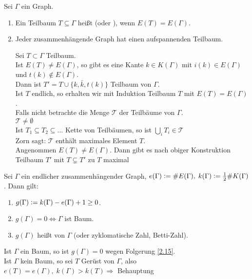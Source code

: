 \documentclass[a4paper, 10pt]{report}
\begin{document}
\begin{DefBem}
Sei $\Gamma$ ein Graph.
\begin{enumerate}
  \item Ein Teilbaum $T \subseteq \Gamma$ heißt
   (oder ),
  wenn $E(T)=E(\Gamma)$.
  \item Jeder zusammenhängende Graph hat einen aufspannenden Teilbaum.
  \begin{Bew}
  Sei $T \subset \Gamma$ Teilbaum.\\
  Ist $E(T) \not= E(\Gamma)$, so gibt es eine Kante $k \in K(\Gamma)$ mit $i(k)
  \in E(\Gamma)$ und $t(k) \not\in E(\Gamma)$.\\
  Dann ist $T' = T \cup \{k, \bar{k}, t(k)\}$ Teilbaum von $\Gamma$.\\
  Ist $T$ endlich, so erhalten wir mit Induktion Teilbaum $T$ mit $E(T) =
  E(\Gamma)$.\\
  Falls nicht betrachte die Menge $\mathcal{T}$ der Teilbäume von $\Gamma$.\\
  $\mathcal{T} \not= \emptyset$ \chk\\ 
  Ist $T_1 \subseteq T_2 \subseteq \ldots$ Kette von Teilbäumen, so ist
  $\bigcup_i T_i \in \mathcal{T}$ \chk\\
  Zorn sagt: $\mathcal{T}$ enthält maximales Element $T$.\\
  Angenommen $E(T) \not= E(\Gamma)$. Dann gibt es nach obiger Konstruktion
  Teilbaum $T'$ mit $T \subsetneq T'$ \WSpr zu $T$ maximal
  \end{Bew}
\end{enumerate}
\end{DefBem}


\begin{BemDef}
\label{2.7}
Sei $\Gamma$ ein endlicher zusammenhängender Graph, $e(\Gamma) \mathrel{\mathop:}=
\#E(\Gamma), \; k(\Gamma) \mathrel{\mathop:}= \frac{1}{2}\#K(\Gamma)$.
Dann gilt:
\begin{enumerate}
  \item $g(\Gamma) \mathrel{\mathop:}= k(\Gamma) - e(\Gamma) + 1 \ge 0$.
  \item \label{2.7b}
  $g(\Gamma) = 0 \Leftrightarrow \Gamma$ ist Baum.
  \item $g(\Gamma)$ heißt  von $\Gamma$ (oder
  zyklomatische Zahl, Betti-Zahl).
\end{enumerate}
\end{BemDef}

\begin{Bew}
Ist $\Gamma$ ein Baum, so ist $g(\Gamma) = 0$ wegen Folgerung \ref{2.15}.\\
Ist $\Gamma$ kein Baum, so sei $T$ Gerüst von $\Gamma$, also $e(T) = e(\Gamma),
\; k(\Gamma) > k(T) \Rightarrow$ Behauptung
\end{Bew}
\end{document}
